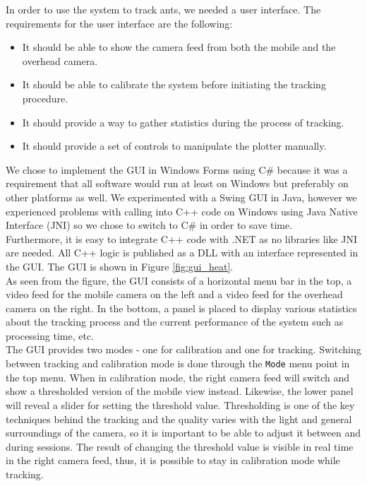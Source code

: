In order to use the system to track ants, we needed a user interface. The requirements for the user interface are the following:

\begin{itemize}
  \item{It should be able to show the camera feed from both the mobile and the overhead camera}.
  \item{It should be able to calibrate the system before initiating the tracking procedure}.
  \item{It should provide a way to gather statistics during the process of tracking}.
  \item{It should provide a set of controls to manipulate the plotter manually}.
\end{itemize}


We chose to implement the GUI in Windows Forms using C\# because it was a requirement that all software would run at least on Windows but preferably on other platforms as well. We experimented with a Swing GUI in Java, however we experienced problems with calling into C++ code on Windows using Java Native Interface (JNI) so we chose to switch to C\# in order to save time. \\

Furthermore, it is easy to integrate C++ code with .NET as no libraries like JNI are needed. All C++ logic is published as a DLL with an interface represented in the GUI. The GUI is shown in Figure \ref{fig:gui_heat}. \\

As seen from the figure, the GUI consists of a horizontal menu bar in the top, a video feed for the mobile camera on the left and a video feed for the overhead camera on the right. In the bottom, a panel is placed to display various statistics about the tracking process and the current performance of the system such as processing time, etc. \\

The GUI provides two modes - one for calibration and one for tracking. Switching between tracking and calibration mode is done through the \texttt{Mode} menu point in the top menu. When in calibration mode, the right camera feed will switch and show a thresholded version of the mobile view instead. Likewise, the lower panel will reveal a slider for setting the threshold value. Thresholding is one of the key techniques behind the tracking and the quality varies with the light and general surroundings of the camera, so it is important to be able to adjust it between and during sessions. The result of changing the threshold value is visible in real time in the right camera feed, thus, it is possible to stay in calibration mode while tracking. \\

